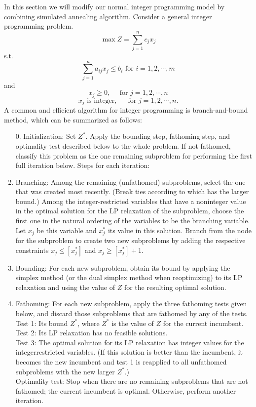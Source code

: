 \documentclass{mcmthesis}
\begin{document}
In this section we will modify our normal integer programming model by combining simulated annealing algorithm. 
Consider a general integer programming problem.
\[
\max Z = \sum _ { j = 1 } ^ { n } c _ { j } x _ { j }
\]
s.t.
\[
\sum _ { j = 1 } ^ { n } a _ { i j } x _ { j } \leq b _ { i }\text{ for }i=1,2,\cdots,m
\]
and
\[
x _ { j } \geq 0 , \quad \text { for } j = 1,2 , \cdots , n
\]
\[
x _ { j } \text { is integer, } \quad \text { for } j = 1,2 , \cdots , n .
\]
A common and efficient algorithm for integer programming is branch-and-bound method, which can be summarized as follows:
\begin{enumerate}
	\item[0.] Initialization: Set $Z^*$. Apply the bounding step, fathoming step, and optimality test described below to the whole problem. If not fathomed, classify this problem as the one remaining subproblem for performing the first full
	iteration below.
	Steps for each iteration:
	\item Branching: Among the remaining (unfathomed) subproblems, select the one that was
	created most recently. (Break ties according to which has the larger bound.) Among
	the integer-restricted variables that have a noninteger value in the optimal solution for
	the LP relaxation of the subproblem, choose the first one in the natural ordering of the
	variables to be the branching variable. Let $x_j$ be this variable and $x_j^*$ its value in this solution. Branch from the node for the subproblem to create two new subproblems by adding the respective constraints $x_j\le[x_j^*]$ and $x_j\ge[x_j^*]+1$.
	\item Bounding: For each new subproblem, obtain its bound by applying the simplex method
	(or the dual simplex method when reoptimizing) to its LP relaxation and using the
	value of $Z$ for the resulting optimal solution.
	\item Fathoming: For each new subproblem, apply the three fathoming tests given below, and discard those subproblems that are fathomed by any of the tests.\\
	Test 1: Its bound $Z^*$, where $Z^*$ is the value of $Z$ for the current incumbent.\\
	Test 2: Its LP relaxation has no feasible solutions.\\
	Test 3: The optimal solution for its LP relaxation has integer values for the integerrestricted variables. (If this solution is better than the incumbent, it becomes the new incumbent and test 1 is reapplied to all unfathomed subproblems with	the new larger $Z^*$.)\\
	Optimality test: Stop when there are no remaining subproblems that are not fathomed; the current incumbent is optimal. Otherwise, perform another iteration.
\end{enumerate}
\end{document}
